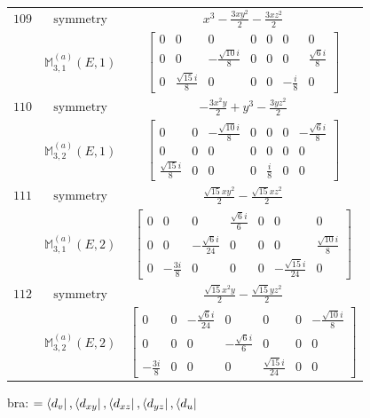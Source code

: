 \documentclass[fleqn,8pt,landscape]{jsarticle}
\begin{document}
\begin{longtable}{ccc}
$ 109 $ & $ \text{symmetry} $ & $ x^{3} - \frac{3 x y^{2}}{2} - \frac{3 x z^{2}}{2} $ \\
$  $ & $ \mathbb{M}_{3,1}^{(a)}(E,1) $ & $ \begin{bmatrix} 0 & 0 & 0 & 0 & 0 & 0 & 0 \\ 0 & 0 & - \frac{\sqrt{10} i}{8} & 0 & 0 & 0 & \frac{\sqrt{6} i}{8} \\ 0 & \frac{\sqrt{15} i}{8} & 0 & 0 & 0 & - \frac{i}{8} & 0 \end{bmatrix} $ \\ \hline
$ 110 $ & $ \text{symmetry} $ & $ - \frac{3 x^{2} y}{2} + y^{3} - \frac{3 y z^{2}}{2} $ \\
$  $ & $ \mathbb{M}_{3,2}^{(a)}(E,1) $ & $ \begin{bmatrix} 0 & 0 & - \frac{\sqrt{10} i}{8} & 0 & 0 & 0 & - \frac{\sqrt{6} i}{8} \\ 0 & 0 & 0 & 0 & 0 & 0 & 0 \\ \frac{\sqrt{15} i}{8} & 0 & 0 & 0 & \frac{i}{8} & 0 & 0 \end{bmatrix} $ \\ \hline
$ 111 $ & $ \text{symmetry} $ & $ \frac{\sqrt{15} x y^{2}}{2} - \frac{\sqrt{15} x z^{2}}{2} $ \\
$  $ & $ \mathbb{M}_{3,1}^{(a)}(E,2) $ & $ \begin{bmatrix} 0 & 0 & 0 & \frac{\sqrt{6} i}{6} & 0 & 0 & 0 \\ 0 & 0 & - \frac{\sqrt{6} i}{24} & 0 & 0 & 0 & \frac{\sqrt{10} i}{8} \\ 0 & - \frac{3 i}{8} & 0 & 0 & 0 & - \frac{\sqrt{15} i}{24} & 0 \end{bmatrix} $ \\ \hline
$ 112 $ & $ \text{symmetry} $ & $ \frac{\sqrt{15} x^{2} y}{2} - \frac{\sqrt{15} y z^{2}}{2} $ \\
$  $ & $ \mathbb{M}_{3,2}^{(a)}(E,2) $ & $ \begin{bmatrix} 0 & 0 & - \frac{\sqrt{6} i}{24} & 0 & 0 & 0 & - \frac{\sqrt{10} i}{8} \\ 0 & 0 & 0 & - \frac{\sqrt{6} i}{6} & 0 & 0 & 0 \\ - \frac{3 i}{8} & 0 & 0 & 0 & \frac{\sqrt{15} i}{24} & 0 & 0 \end{bmatrix} $ \\ \hline
\end{longtable}
bra: $=\bra{d_{v}}, \bra{d_{xy}}, \bra{d_{xz}}, \bra{d_{yz}}, \bra{d_{u}}$
\end{document}
